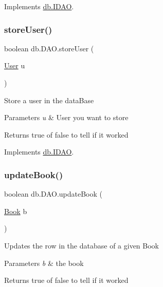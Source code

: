 Implements \hyperlink{interfacedb_1_1_i_d_a_o_a39851dc1e1f05af40afeb76a5f8be99a}{db.\+I\+D\+AO}.

\mbox{\label{classdb_1_1_d_a_o_a1600c5d7d28eb225fc7c244fdfb16150}} 
\subsubsection{\texorpdfstring{store\+User()}{storeUser()}}
{\footnotesize\ttfamily boolean db.\+D\+A\+O.\+store\+User (\begin{DoxyParamCaption}\item[{\hyperlink{classserver_1_1data_1_1_user}{User}}]{u }\end{DoxyParamCaption})}

Store a user in the data\+Base 
\begin{DoxyParams}{Parameters}
{\em u} & User you want to store \\
\hline
\end{DoxyParams}
\begin{DoxyReturn}{Returns}
true of false to tell if it worked 
\end{DoxyReturn}


Implements \hyperlink{interfacedb_1_1_i_d_a_o_a5b1f408c9a25305e977e962faa38b026}{db.\+I\+D\+AO}.

\mbox{\label{classdb_1_1_d_a_o_a4ea10c177ef93a3084ed74b38556adca}} 
\subsubsection{\texorpdfstring{update\+Book()}{updateBook()}}
{\footnotesize\ttfamily boolean db.\+D\+A\+O.\+update\+Book (\begin{DoxyParamCaption}\item[{\hyperlink{classserver_1_1data_1_1_book}{Book}}]{b }\end{DoxyParamCaption})}

Updates the row in the database of a given Book 
\begin{DoxyParams}{Parameters}
{\em b} & the book \\
\hline
\end{DoxyParams}
\begin{DoxyReturn}{Returns}
true of false to tell if it worked 
\end{DoxyReturn}


